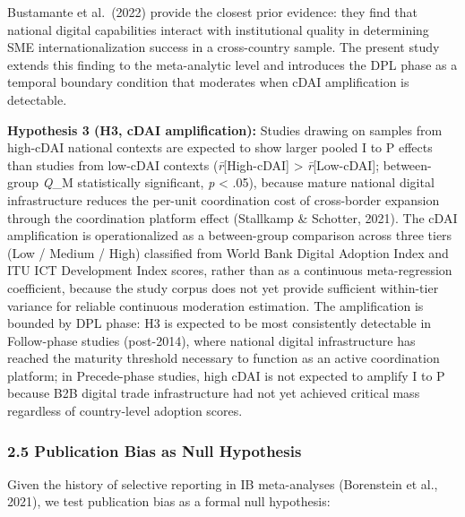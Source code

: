\documentclass[
  12pt,a4paper]{article}
\begin{document}
Bustamante et al.~(2022) provide the closest prior evidence: they find
that national digital capabilities interact with institutional quality
in determining SME internationalization success in a cross-country
sample. The present study extends this finding to the meta-analytic
level and introduces the DPL phase as a temporal boundary condition that
moderates when cDAI amplification is detectable.

\textbf{Hypothesis 3 (H3, cDAI amplification):} Studies drawing on
samples from high-cDAI national contexts are expected to show larger
pooled I to P effects than studies from low-cDAI contexts
(\emph{r̄}{[}High-cDAI{]} \textgreater{} \emph{r̄}{[}Low-cDAI{]};
between-group \emph{Q}\_M statistically significant, \emph{p}
\textless{} .05), because mature national digital infrastructure reduces
the per-unit coordination cost of cross-border expansion through the
coordination platform effect (Stallkamp \& Schotter, 2021). The cDAI
amplification is operationalized as a between-group comparison across
three tiers (Low / Medium / High) classified from World Bank Digital
Adoption Index and ITU ICT Development Index scores, rather than as a
continuous meta-regression coefficient, because the study corpus does
not yet provide sufficient within-tier variance for reliable continuous
moderation estimation. The amplification is bounded by DPL phase: H3 is
expected to be most consistently detectable in Follow-phase studies
(post-2014), where national digital infrastructure has reached the
maturity threshold necessary to function as an active coordination
platform; in Precede-phase studies, high cDAI is not expected to amplify
I to P because B2B digital trade infrastructure had not yet achieved
critical mass regardless of country-level adoption scores.

\hypertarget{publication-bias-as-null-hypothesis}{%
\subsubsection{2.5 Publication Bias as Null
Hypothesis}\label{publication-bias-as-null-hypothesis}}

Given the history of selective reporting in IB meta-analyses (Borenstein
et al., 2021), we test publication bias as a formal null hypothesis:
\end{document}
